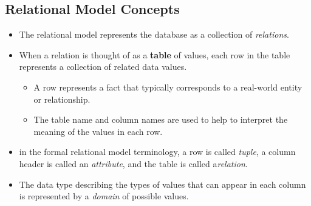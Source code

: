 \documentclass[10pt]{article}
\newcommand{\tf}{\textbf}
\newcommand{\ti}{\textit}
\begin{document}
\subsection{Relational Model Concepts}

\begin{itemize}
	\item The relational model represents the database as a collection of \ti{relations}.
	\item When a relation is thought of as a \tf{table} of values, each row in the table represents a collection of related data values.
	\begin{itemize}
		\item A row represents a fact that typically corresponds to a real-world entity or relationship.
		\item The table name and column names are used to help to interpret the meaning of the values in each row.
	\end{itemize}
	\item in the formal relational model terminology, a row is called \ti{tuple}, a column header is called an \ti{attribute}, and the table is called a\ti{relation}.
	\item The data type describing the types of values that can appear in each column is represented by a \ti{domain} of possible values.
\end{itemize}  
\end{document}
